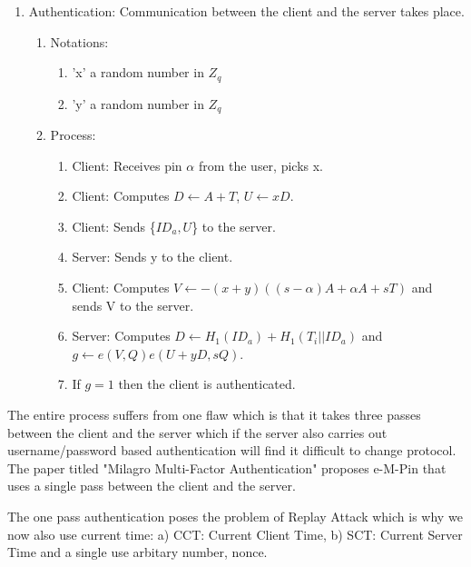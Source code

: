 \documentclass[]{article}   %
\begin{document}
\begin{enumerate}
\begin{enumerate}
\begin{enumerate}
        \end{enumerate}
    \end{enumerate}
    \item Authentication: Communication between the client and the server takes place.
    \begin{enumerate}
        \item Notations:
        \begin{enumerate}
            \item 'x' a random number in $Z_q$
            \item 'y' a random number in $Z_q$
        \end{enumerate}
        \item Process:
        \begin{enumerate}
            \item Client: Receives pin $\alpha$ from the user, picks x.
            \item Client: Computes $D \leftarrow A + T$, $U \leftarrow xD$.
            \item Client: Sends \{$ID_a, U$\} to the server.
            \item Server: Sends y to the client.
            \item Client: Computes $V \leftarrow -(x+y)((s-\alpha)A +\alpha A+sT)$ and sends V to the server.
            \item Server: Computes $D \leftarrow H_1(ID_a)+H_1(T_i||ID_a)$ and \newline $g \leftarrow e(V,Q)e(U+yD,sQ)$.
            \item If $g = 1$ then the client is authenticated.
        \end{enumerate}
    \end{enumerate}
\end{enumerate}
The entire process suffers from one flaw which is that it takes three passes between the client and the server which if the server also carries out username/password based authentication will find it difficult to change protocol. The paper titled "Milagro Multi-Factor Authentication" proposes e-M-Pin that uses a single pass between the client and the server.

The one pass authentication poses the problem of Replay Attack which is why we now also use current time: a) CCT: Current Client Time, b) SCT: Current Server Time and a single use arbitary number, nonce.
\end{document}
